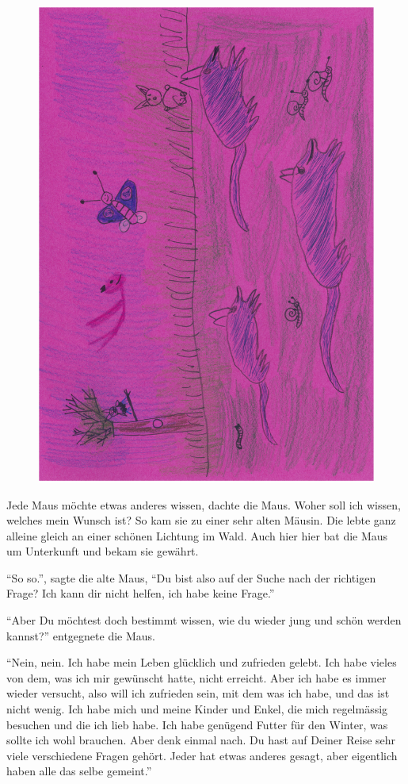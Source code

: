 \begin{figure}[ht]
\centering
\includegraphics[angle=270,width=.7\textwidth]{bilder/maus_1.pdf}
\end{figure}

Jede Maus möchte etwas anderes wissen, dachte die Maus. Woher soll ich wissen, welches mein Wunsch ist? So kam sie zu einer sehr alten Mäusin. Die lebte ganz alleine gleich an einer schönen Lichtung im Wald. Auch hier hier bat die Maus um Unterkunft und bekam sie gewährt. 

\enquote{So so.}, sagte die alte Maus, \enquote{Du bist also auf der Suche nach der richtigen Frage? Ich kann dir nicht helfen, ich habe keine Frage.} 

\enquote{Aber Du möchtest doch bestimmt wissen, wie du wieder jung und schön werden kannst?} entgegnete die Maus.

\enquote{Nein, nein. Ich habe mein Leben glücklich und zufrieden gelebt. Ich habe vieles von dem, was ich mir gewünscht hatte, nicht erreicht. Aber ich habe es immer wieder versucht, also will ich zufrieden sein, mit dem was ich habe, und das ist nicht wenig. Ich habe mich und meine Kinder und Enkel, die mich regelmässig besuchen und die ich lieb habe. Ich habe genügend Futter für den Winter, was sollte ich wohl brauchen. Aber denk einmal nach. Du hast auf Deiner Reise sehr viele verschiedene Fragen gehört. Jeder hat etwas anderes gesagt, aber eigentlich haben alle das selbe gemeint.}

